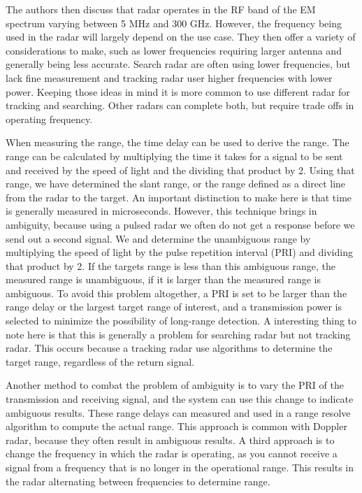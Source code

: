 \documentclass[12pt]{article}
\begin{document}
The authors then discuss that radar operates in the RF band of the EM spectrum varying between 5 MHz and 300 GHz. However, the frequency being used in the radar will largely depend on the use case. They then offer a variety of considerations to make, such as lower frequencies requiring larger antenna and generally being less accurate. Search radar are often using lower frequencies, but lack fine measurement and tracking radar user higher frequencies with lower power. Keeping those ideas in mind it is more common to use different radar for tracking and searching. Other radars can complete both, but require trade offs in operating frequency. 

When measuring the range, the time delay can be used to derive the range. The range can be calculated by multiplying the time it takes for a signal to be sent and received by the speed of light and the dividing that product by 2. Using that range, we have determined the slant range, or the range defined as a direct line from the radar to the target. An important distinction to make here is that time is generally measured in microseconds. However, this technique brings in ambiguity, because using a pulsed radar we often do not get a response before we send out a second signal. We and determine the unambiguous range by multiplying the speed of light by the pulse repetition interval (PRI) and dividing that product by 2. If the targets range is less than this ambiguous range, the measured range is unambiguous, if it is larger than the measured range is ambiguous. To avoid this problem altogether, a PRI is set to be larger than the range delay or the largest target range of interest, and a transmission power is selected to minimize the possibility of long-range detection. A interesting thing to note here is that this is generally a problem for searching radar but not tracking radar. This occurs because a tracking radar use algorithms to determine the target range, regardless of the return signal. 

Another method to combat the problem of ambiguity is to vary the PRI of the transmission and receiving signal,  and the system can use this change to indicate ambiguous results. These range delays can measured and used in a range resolve algorithm to compute the actual range. This approach is common with Doppler radar, because they often result in ambiguous results. A third approach is to change the frequency in which the radar is operating, as you cannot receive a signal from a frequency that is no longer in the operational range. This results in the radar alternating between frequencies to determine range.
\end{document}
